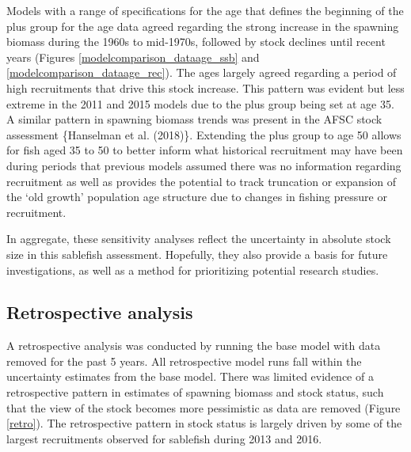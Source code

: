 \documentclass[11pt,
  english,
  a4paper,
]{article}
\begin{document}
Models with a range of specifications for the age that defines the beginning of the plus group for the age data agreed regarding the strong increase in the spawning biomass during the 1960s to mid-1970s, followed by stock declines until recent years (Figures \ref{modelcomparison_dataage_ssb} and \ref{modelcomparison_dataage_rec}). The ages largely agreed regarding a period of high recruitments that drive this stock increase. This pattern was evident but less extreme in the 2011 and 2015 models due to the plus group being set at age 35. A similar pattern in spawning biomass trends was present in the AFSC stock assessment \{{Hanselman et al. (2018)\leavevmode\tagmcend\tagstructend}\}. Extending the plus group to age 50 allows for fish aged 35 to 50 to better inform what historical recruitment may have been during periods that previous models assumed there was no information regarding recruitment as well as provides the potential to track truncation or expansion of the `old growth' population age structure due to changes in fishing pressure or recruitment.

\leavevmode\tagmcend\tagstructend\par


In aggregate, these sensitivity analyses reflect the uncertainty in absolute stock size in this sablefish assessment. Hopefully, they also provide a basis for future investigations, as well as a method for prioritizing potential research studies.

\leavevmode\tagmcend\tagstructend\par


\hypertarget{retrospective-analysis}{%
\subsection{Retrospective analysis}\label{retrospective-analysis}}

\leavevmode\tagmcend\tagstructend

A retrospective analysis was conducted by running the base model with data removed for the past 5 years. All retrospective model runs fall within the uncertainty estimates from the base model. There was limited evidence of a retrospective pattern in estimates of spawning biomass and stock status, such that the view of the stock becomes more pessimistic as data are removed (Figure \ref{retro}). The retrospective pattern in stock status is largely driven by some of the largest recruitments observed for sablefish during 2013 and 2016.
\end{document}
